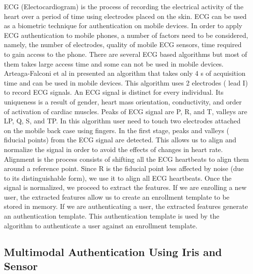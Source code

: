 \documentclass[10pt,a4paper,journal]{IEEEtran}
\begin{document}
\hspace{2em} ECG (Electocardiogram) is the process of recording the electrical activity of the heart over a period of time using electrodes placed on the skin. ECG can be used as a biometric technique for authentication on mobile devices.
In order to apply ECG authentication to mobile phones, a number of factors need to be
considered, namely, the number of electrodes, quality of mobile ECG sensors, time required to gain access to the phone. There are several ECG based algorithms but most of them takes large access time and some can not be used in mobile devices. Arteaga-Falconi et al in \cite{3} presented an algorithm that takes only 4 s of acquisition time and can be used in mobile devices. This algorithm uses 2 electrodes ( lead I) to record ECG signals. An ECG signal is distinct for every individual. Its uniqueness is a result of gender, heart mass orientation, conductivity, and order of activation of cardiac muscles. Peaks of ECG signal are P, R, and T, valleys are LP, Q, S, and TP. In this algorithm user need to touch two electrodes attached on the mobile back case using fingers. In the first stage, peaks and valleys ( fiducial points) from the ECG signal are detected\cite{4}. This allows us to align and normalize the signal in order to avoid the effects of changes in heart rate. Alignment is the process consists of shifting all the ECG heartbeats to align them around a reference point. Since R is the fiducial point less affected by noise (due to its distinguishable form), we use it to align all ECG heartbeats. Once the signal is normalized, we proceed to extract the features. If we are enrolling a new user, the extracted features allow us to create an enrollment template to be stored in memory. If we are authenticating a user, the extracted features generate an authentication template. This authentication template is used by the algorithm to authenticate a user against an enrollment template.

\subsection{Multimodal Authentication Using Iris and Sensor}
\end{document}
